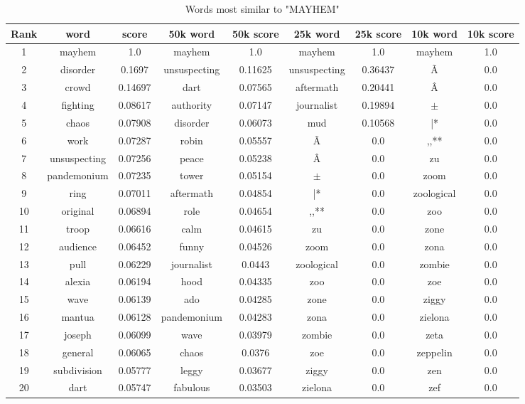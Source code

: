 \documentclass[10pt, a4paper, oneside]{article} %
\begin{document}
\begin{table}[!h]
\centering
\begin{tabular}{ | c | c | c | | c | c || c | c || c | c |}
\hline
Rank & word & score  & 50k word & 50k score & 25k word & 25k score & 10k word & 10k score\\ \hline
1 & mayhem & 1.0 &mayhem & 1.0 &mayhem & 1.0 &mayhem & 1.0 \\
2 & disorder & 0.1697 & unsuspecting & 0.11625 &unsuspecting & 0.36437 &Ã & 0.0 \\
3 & crowd & 0.14697 &dart & 0.07565 &aftermath & 0.20441 &Â & 0.0 \\
4 & fighting & 0.08617 &authority & 0.07147 &journalist & 0.19894 &$\pm$ & 0.0 \\
5 & chaos & 0.07908 &disorder & 0.06073 &mud & 0.10568 &|* & 0.0 \\
6 & work & 0.07287 &robin & 0.05557 &Ã & 0.0 &,,** & 0.0 \\
7 & unsuspecting & 0.07256 &peace & 0.05238 &Â & 0.0 &zu & 0.0 \\
8 & pandemonium & 0.07235 &tower & 0.05154 &$\pm$ & 0.0 &zoom & 0.0 \\
9 & ring & 0.07011 &aftermath & 0.04854 &|* & 0.0 &zoological & 0.0 \\
10 & original & 0.06894 &role & 0.04654 &,,** & 0.0 &zoo & 0.0 \\
11 & troop & 0.06616 &calm & 0.04615 &zu & 0.0 &zone & 0.0 \\
12 & audience & 0.06452 &funny & 0.04526 &zoom & 0.0 &zona & 0.0 \\
13 & pull & 0.06229 &journalist & 0.0443 &zoological & 0.0 &zombie & 0.0 \\
14 & alexia & 0.06194 &hood & 0.04335 &zoo & 0.0 &zoe & 0.0 \\
15 & wave & 0.06139 &ado & 0.04285 &zone & 0.0 &ziggy & 0.0 \\
16 & mantua & 0.06128 &pandemonium & 0.04283 &zona & 0.0 &zielona & 0.0 \\
17 & joseph & 0.06099 &wave & 0.03979 &zombie & 0.0 &zeta & 0.0 \\
18 & general & 0.06065 &chaos & 0.0376 &zoe & 0.0 &zeppelin & 0.0 \\
19 & subdivision & 0.05777 &leggy & 0.03677 &ziggy & 0.0 &zen & 0.0 \\
20 & dart & 0.05747 &fabulous & 0.03503 &zielona & 0.0 &zef & 0.0 \\
 \hline
\end{tabular}
\caption{Words most similar to "MAYHEM"}
\label{mayhem}
\end{table}
\end{document}
